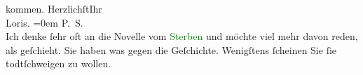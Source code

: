                     kommen.\pend
           \pstart
           Herzlichſt\hspace*{2.5em}Ihr{\\[\baselineskip]}\spacefill\mbox{Loris.}\pend
           \leftskip=0em{}\pstart
           \noindent{}P. S.{\\}Ich denke ſehr oft an die Novelle vom \textcolor{green}{Sterben}{}\ledrightnote{\textcolor{green}{Sterben. Novelle}} und möchte viel mehr davon reden, als geſchieht. Sie haben
                        was gegen die Geſchichte. Wenigſtens ſcheinen Sie ſie todtſchweigen zu
                        wollen.\pend
           \endnumbering{}  
      